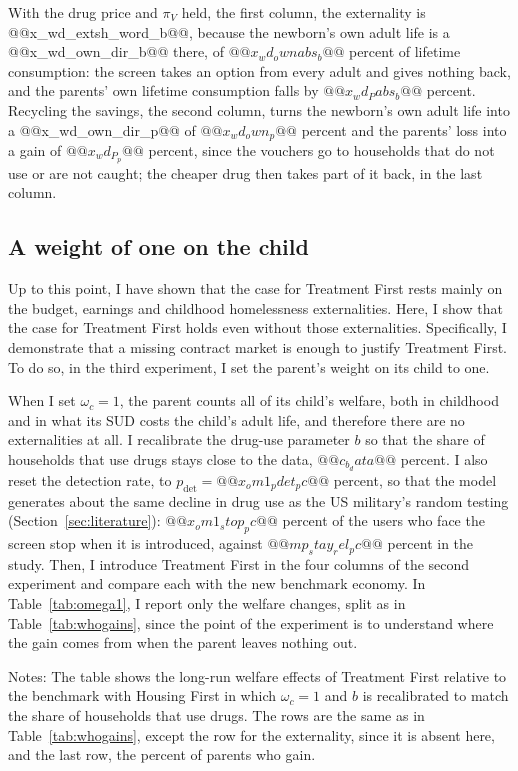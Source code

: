 \documentclass[10pt]{article}
\newcommand{\notes}[2]{\par\vspace{0.4em}%
  \begin{minipage}{#1}\footnotesize #2\end{minipage}}
\newcommand{\tabnote}[1]{\notes{\wd\ntbox}{#1}}
\begin{document}
With the drug price and $\pi_V$ held, the first column, the externality is @@x_wd_extsh_word_b@@, because the newborn's own adult life is a @@x_wd_own_dir_b@@ there, of $@@x_wd_ownabs_b@@$ percent of lifetime consumption: the screen takes an option from every adult and gives nothing back, and the parents' own lifetime consumption falls by $@@x_wd_Pabs_b@@$ percent. Recycling the savings, the second column, turns the newborn's own adult life into a @@x_wd_own_dir_p@@ of $@@x_wd_own_p@@$ percent and the parents' loss into a gain of $@@x_wd_P_p@@$ percent, since the vouchers go to households that do not use or are not caught; the cheaper drug then takes part of it back, in the last column.

\subsection{A weight of one on the child}\label{sec:omega1}

Up to this point, I have shown that the case for Treatment First rests mainly on the budget, earnings and childhood homelessness externalities. Here, I show that the case for Treatment First holds even without those externalities. Specifically, I demonstrate that a missing contract market is enough to justify Treatment First. To do so, in the third experiment, I set the parent's weight on its child to one.

When I set $\omega_c=1$, the parent counts all of its child's welfare, both in childhood and in what its SUD costs the child's adult life, and therefore there are no externalities at all. I recalibrate the drug-use parameter $b$ so that the share of households that use drugs stays close to the data, $@@c_b_data@@$ percent. I also reset the detection rate, to $p_{\mathrm{det}}=@@x_om1_pdet_pc@@$ percent, so that the model generates about the same decline in drug use as the US military's random testing (Section~\ref{sec:literature}): $@@x_om1_stop_pc@@$ percent of the users who face the screen stop when it is introduced, against $@@mp_stay_rel_pc@@$ percent in the study. Then, I introduce Treatment First in the four columns of the second experiment and compare each with the new benchmark economy. In Table~\ref{tab:omega1}, I report only the welfare changes, split as in Table~\ref{tab:whogains}, since the point of the experiment is to understand where the gain comes from when the parent leaves nothing out.

\begin{table}[!tb]\centering
\caption{A weight of one on the child: the change in welfare}\label{tab:omega1}
\begingroup\small
\sbox{\ntbox}{}\usebox{\ntbox}
\tabnote{Notes: The table shows the long-run welfare effects of Treatment First relative to the benchmark with Housing First in which $\omega_c=1$ and $b$ is recalibrated to match the share of households that use drugs. The rows are the same as in Table~\ref{tab:whogains}, except the row for the externality, since it is absent here, and the last row, the percent of parents who gain. }
\endgroup
\end{table}
\end{document}
